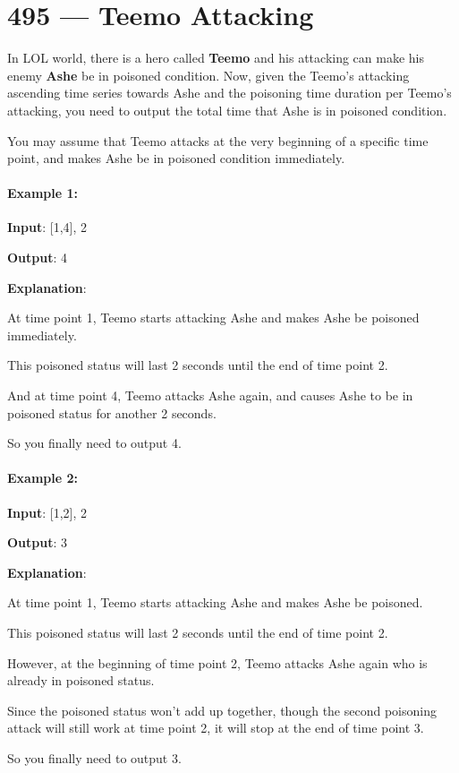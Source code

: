 \section{495 --- Teemo Attacking}
In LOL world, there is a hero called \textbf{Teemo} and his attacking can make his enemy \textbf{Ashe} be in poisoned condition. Now, given the Teemo's attacking ascending time series towards Ashe and the poisoning time duration per Teemo's attacking, you need to output the total time that Ashe is in poisoned condition.

You may assume that Teemo attacks at the very beginning of a specific time point, and makes Ashe be in poisoned condition immediately.

\paragraph{Example 1:}

\begin{flushleft}
\textbf{Input}: [1,4], 2

\textbf{Output}: 4

\textbf{Explanation}: 

At time point 1, Teemo starts attacking Ashe and makes Ashe be poisoned immediately. 

This poisoned status will last 2 seconds until the end of time point 2. 

And at time point 4, Teemo attacks Ashe again, and causes Ashe to be in poisoned status for another 2 seconds. 

So you finally need to output 4.
 
\end{flushleft}

\paragraph{Example 2:}

\begin{flushleft}
\textbf{Input}: [1,2], 2

\textbf{Output}: 3

\textbf{Explanation}: 

At time point 1, Teemo starts attacking Ashe and makes Ashe be poisoned. 

This poisoned status will last 2 seconds until the end of time point 2. 

However, at the beginning of time point 2, Teemo attacks Ashe again who is already in poisoned status. 

Since the poisoned status won't add up together, though the second poisoning attack will still work at time point 2, it will stop at the end of time point 3. 

So you finally need to output 3.
\end{flushleft}
 

